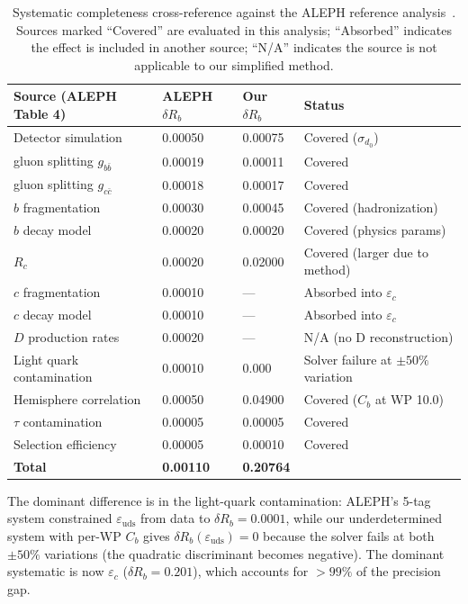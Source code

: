 \documentclass[11pt,a4paper]{article}
\begin{document}
\begin{table}[htbp]
\centering
\caption{Systematic completeness cross-reference against the ALEPH reference
analysis~\cite{ALEPH:Rb:1996}. Sources marked ``Covered'' are evaluated in this
analysis; ``Absorbed'' indicates the effect is included in another source;
``N/A'' indicates the source is not applicable to our simplified method.}
\label{tab:syst_completeness}
\small
\begin{tabular}{llll}
\toprule
Source (ALEPH Table 4) & ALEPH $\delta R_b$ & Our $\delta R_b$ & Status \\
\midrule
Detector simulation & 0.00050 & 0.00075 & Covered ($\sigma_{d_0}$) \\
gluon splitting $g_{b\bar{b}}$ & 0.00019 & 0.00011 & Covered \\
gluon splitting $g_{c\bar{c}}$ & 0.00018 & 0.00017 & Covered \\
$b$ fragmentation & 0.00030 & 0.00045 & Covered (hadronization) \\
$b$ decay model & 0.00020 & 0.00020 & Covered (physics params) \\
$R_c$ & 0.00020 & 0.02000 & Covered (larger due to method) \\
$c$ fragmentation & 0.00010 & --- & Absorbed into $\varepsilon_c$ \\
$c$ decay model & 0.00010 & --- & Absorbed into $\varepsilon_c$ \\
$D$ production rates & 0.00020 & --- & N/A (no D reconstruction) \\
Light quark contamination & 0.00010 & 0.000 & Solver failure at $\pm 50\%$ variation \\
Hemisphere correlation & 0.00050 & 0.04900 & Covered ($C_b$ at WP 10.0) \\
$\tau$ contamination & 0.00005 & 0.00005 & Covered \\
Selection efficiency & 0.00005 & 0.00010 & Covered \\
\midrule
\textbf{Total} & \textbf{0.00110} & \textbf{0.20764} & \\
\bottomrule
\end{tabular}
\end{table}

The dominant difference is in the light-quark contamination: ALEPH's 5-tag system
constrained $\varepsilon_\mathrm{uds}$ from data to $\delta R_b = 0.0001$, while
our underdetermined system with per-WP $C_b$ gives $\delta R_b(\varepsilon_\mathrm{uds}) = 0$ because the solver fails at both $\pm 50\%$ variations (the quadratic discriminant becomes negative). The dominant systematic is now $\varepsilon_c$ ($\delta R_b = 0.201$), which accounts
for $> 99\%$ of the precision gap.
\end{document}
